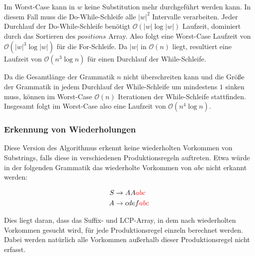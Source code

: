 Im Worst-Case kann in $w$ keine Substitution mehr durchgeführt werden kann. In diesem Fall muss die Do-While-Schleife alle $|w|^2$ Intervalle verarbeiten. Jeder Durchlauf der Do-While-Schleife benötigt $\mathcal{O}(|w| \log |w|)$ Laufzeit, dominiert durch das Sortieren des $positions$ Array. Also folgt eine Worst-Case Laufzeit von $\mathcal{O}(|w|^3 \log |w|)$ für die For-Schleife. Da $|w|$ in $\mathcal{O}(n)$ liegt, resultiert eine Laufzeit von $\mathcal{O}(n^3 \log n)$ für einen Durchlauf der While-Schleife.

Da die Gesamtlänge der Grammatik $n$ nicht überschreiten kann und die Größe der Grammatik in jedem Durchlauf der While-Schleife um mindestens $1$ sinken muss, können im Worst-Case $\mathcal{O}(n)$ Iterationen der While-Schleife stattfinden. Insgesamt folgt im Worst-Case also eine Laufzeit von $\mathcal{O}(n^4 \log n)$.


\subsubsection{Erkennung von Wiederholungen}

Diese Version des Algorithmus erkennt keine wiederholten Vorkommen von Substrings, falls diese in verschiedenen Produktionsregeln auftreten.
Etwa würde in der folgenden Grammatik das wiederholte Vorkommen von $abc$ nicht erkannt werden:

\begin{align*}
	S &\rightarrow AA\textcolor{red}{abc}\\
	A &\rightarrow cdef\textcolor{red}{abc}
\end{align*}

Dies liegt daran, dass das Suffix- und LCP-Array, in dem nach wiederholten Vorkommen gesucht wird, für jede Produktionsregel einzeln berechnet werden. Dabei werden natürlich alle Vorkommen außerhalb dieser Produktionsregel nicht erfasst.